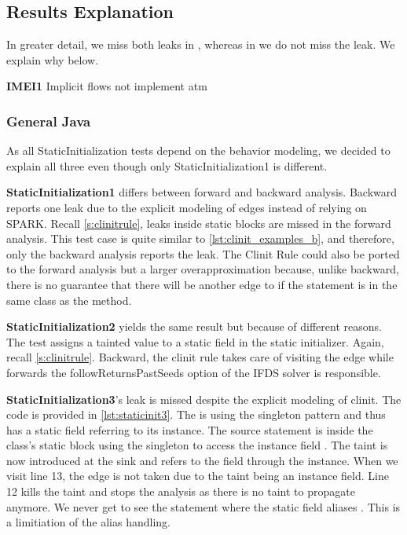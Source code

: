 \documentclass[../draft.tex]{subfiles}
\begin{document}
    \subsection{Results Explanation}
    In greater detail, we miss both leaks in , whereas in  we do not miss the leak. We explain why below.

    \textbf{IMEI1} Implicit flows not implement atm

    \subsubsection{General Java}
    As all StaticInitialization tests depend on the  behavior modeling, we decided to explain all three even though only StaticInitialization1 is different.

    \textbf{StaticInitialization1} differs between forward and backward analysis. Backward reports one leak due to the explicit modeling of  edges instead of relying on SPARK. Recall \autoref{s:clinitrule}, leaks inside static blocks are missed in the forward analysis. This test case is quite similar to \autoref{lst:clinit_examples_b}, and therefore, only the backward analysis reports the leak. The Clinit Rule could also be ported to the forward analysis but a larger overapproximation because, unlike backward, there is no guarantee that there will be another edge to  if the statement is in the same class as the  method. 
    
    \textbf{StaticInitialization2} yields the same result but because of different reasons. The test assigns a tainted value to a static field in the static initializer. Again, recall \autoref{s:clinitrule}. Backward, the clinit rule takes care of visiting the  edge while forwards the followReturnsPastSeeds option of the IFDS solver is responsible. 

    \textbf{StaticInitialization3}'s leak is missed despite the explicit modeling of clinit. The code is provided in \autoref{lst:staticinit3}. The  is using the singleton pattern and thus has a static field  referring to its instance. The source statement is inside the  class's static block using the singleton to access the instance field .
    The taint is now introduced at the sink and refers to the field through the  instance. When we visit line 13, the  edge is not taken due to the taint being an instance field. Line 12 kills the taint and stops the analysis as there is no taint to propagate anymore. We never get to see the statement where the static field  aliases . 
    This is a limitiation of the alias handling. 
    
\end{document}
